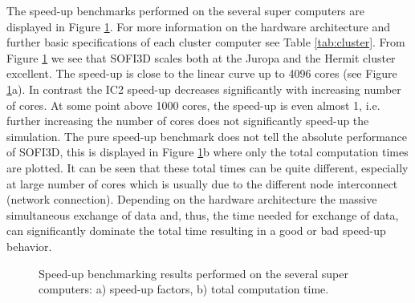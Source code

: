 \documentclass[11pt,onecolumn,oneside]{article}
\begin{document}
The speed-up benchmarks performed on the several super computers are displayed in Figure \ref{speedup_bench}. For more information on the hardware architecture and further basic specifications of each cluster computer see Table \ref{tab:cluster}. From Figure \ref{speedup_bench} we see that SOFI3D scales both at the Juropa and the Hermit cluster excellent. The speed-up is close to the linear curve up to 4096 cores (see Figure \ref{speedup_bench}a). In contrast the IC2 speed-up decreases significantly with increasing number of cores. At some point above 1000 cores, the speed-up is even almost 1, i.e. further increasing the  number of cores does not significantly speed-up the simulation. The pure speed-up benchmark does not tell the absolute performance of SOFI3D, this is displayed in Figure \ref{speedup_bench}b where only the total computation times are plotted. It can be seen that these total times can be quite different, especially at large number of cores which is usually due to the different node interconnect (network connection). Depending on the hardware architecture the massive simultaneous exchange of data and, thus, the time needed for exchange of data, can significantly dominate the total time resulting in a good or bad speed-up behavior.

\begin{figure}[ht]
\begin{center}
\caption{\label{speedup_bench} Speed-up benchmarking results performed on the several super computers: a) speed-up factors, b) total computation time.}
\end{center}
\end{figure}
\end{document}
